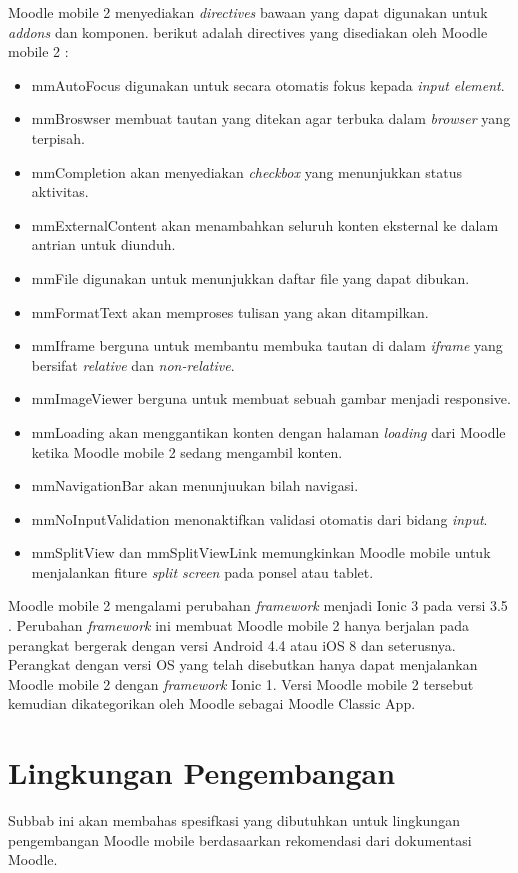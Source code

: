Moodle mobile 2 menyediakan \textit{directives} bawaan yang dapat digunakan untuk \textit{addons} dan komponen. berikut adalah directives yang disediakan oleh Moodle mobile 2 : \cite{moodle:dev}
\begin{itemize}
\item mmAutoFocus digunakan untuk secara otomatis fokus kepada \textit{input element}.
\item mmBroswser membuat tautan yang ditekan agar terbuka dalam \textit{browser} yang terpisah.
\item mmCompletion akan menyediakan \textit{checkbox} yang menunjukkan status aktivitas.
\item mmExternalContent akan menambahkan seluruh konten eksternal ke dalam antrian untuk diunduh.
\item mmFile digunakan untuk menunjukkan daftar file yang dapat dibukan.
\item mmFormatText akan memproses tulisan yang akan ditampilkan.
\item mmIframe berguna untuk membantu membuka tautan di dalam \textit{iframe} yang bersifat \textit{relative} dan \textit{non-relative}.
\item mmImageViewer berguna untuk membuat sebuah gambar menjadi responsive.
\item mmLoading akan menggantikan konten dengan halaman \textit{loading} dari Moodle ketika Moodle mobile 2 sedang mengambil konten.
\item mmNavigationBar akan menunjuukan bilah navigasi.
\item mmNoInputValidation menonaktifkan validasi otomatis dari bidang \textit{input}.
\item mmSplitView dan mmSplitViewLink memungkinkan Moodle mobile untuk menjalankan fiture \textit{split screen} pada ponsel atau tablet.
\end{itemize}

Moodle mobile 2 mengalami perubahan \textit{framework} menjadi Ionic 3 pada versi 3.5 \cite{moodle:dev}. Perubahan \textit{framework} ini membuat Moodle mobile 2 hanya berjalan pada perangkat bergerak dengan versi Android 4.4 atau iOS 8 dan seterusnya. Perangkat dengan versi OS yang telah disebutkan hanya dapat menjalankan Moodle mobile 2 dengan \textit{framework} Ionic 1. Versi Moodle mobile 2 tersebut kemudian dikategorikan oleh Moodle sebagai Moodle Classic App.



\section{Lingkungan Pengembangan}
 Subbab ini akan membahas spesifkasi yang dibutuhkan untuk lingkungan pengembangan Moodle mobile berdasaarkan rekomendasi dari dokumentasi Moodle.

